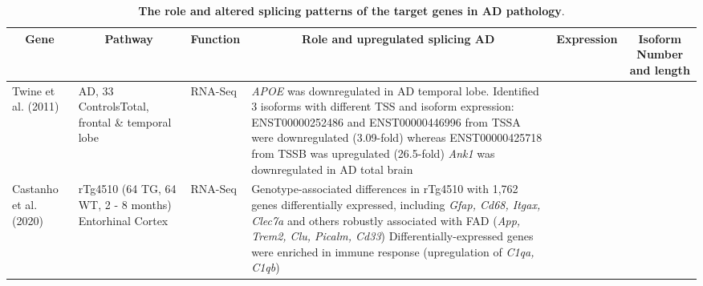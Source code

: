 \begin{changemargin}{1.5cm}
	\begin{landscape}
		\small %
		\setlength\tabcolsep{2pt} %
		\renewcommand{\arraystretch}{1}
		\begin{longtable}[c]{p{1cm}p{2cm}p{3cm}p{14cm}p{2cm}p{2cm}}
			\caption[The role and altered splicing patterns of the target genes in AD pathology]%
			{\textbf{The role and altered splicing patterns of the target genes in AD pathology}. }
			\label{tab: TargetGenes_LitReview}\\
			
			\toprule
			\multicolumn{1}{c}{Gene} &
			\multicolumn{1}{c}{Pathway} &
			\multicolumn{1}{c}{Function} &
			\multicolumn{1}{c}{Role and upregulated splicing AD} &
			\multicolumn{1}{c}{Expression} & 
			\multicolumn{1}{c}{Isoform Number and length} \\* \midrule
			\endfirsthead
			\endhead
			\bottomrule
			\endfoot
			\endlastfoot
			\centering Twine et al. (2011)\cite{Twine2011} &
			\centering 3 AD, 33 Controls\newline Total, frontal \& temporal lobe &
			\centering RNA-Seq &
			\tabitem \textit{APOE} was downregulated in AD temporal lobe. Identified 3 isoforms with different TSS and isoform expression: ENST00000252486 and ENST00000446996 from TSSA were downregulated (3.09-fold) whereas ENST00000425718 from TSSB was upregulated (26.5-fold) \newline
			\tabitem \textit{Ank1} was downregulated in AD total brain \\
			\hdashline[0.5pt/5pt]
			
			
			\centering Castanho et al. (2020) \cite{Castanho2020} &
			\centering rTg4510 (64 TG, 64 WT, 2 - 8 months) \newline Entorhinal Cortex &
			\centering RNA-Seq &
			\tabitem Genotype-associated differences in rTg4510 with 1,762 genes differentially expressed, including \textit{Gfap, Cd68, Itgax, Clec7a} and others robustly associated with FAD (\textit{App, Trem2, Clu, Picalm, Cd33})  
			\tabitem Differentially-expressed genes were enriched in immune response (upregulation of \textit{C1qa, C1qb})\\* \bottomrule
		\end{longtable}
	\end{landscape}
\end{changemargin}


